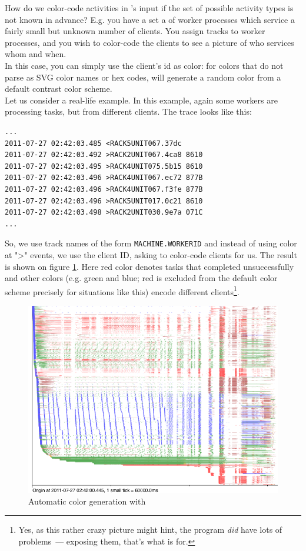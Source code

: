 \documentclass{article}
\begin{document}
How do we color-code activities in \splot{}'s input if the set of possible activity types is not known in advance? E.g. you have a set a of worker processes which service a fairly small but unknown number of clients. You assign tracks to worker processes, and you wish to color-code the clients to see a picture of who services whom and when.
\\
In this case, you can simply use the client's id as color: for colors that do not parse as SVG color names or hex codes, \splot{} will generate a random color from a default contrast color scheme.
\\
Let us consider a real-life example. In this example, again some workers are processing tasks, but from different clients.
The trace looks like this:
\begin{verbatim}
...
2011-07-27 02:42:03.485 <RACK5UNIT067.37dc
2011-07-27 02:42:03.492 >RACK2UNIT067.4ca8 8610
2011-07-27 02:42:03.495 >RACK4UNIT075.5b15 8610
2011-07-27 02:42:03.496 >RACK4UNIT067.ec72 877B
2011-07-27 02:42:03.496 >RACK4UNIT067.f3fe 877B
2011-07-27 02:42:03.496 >RACK5UNIT017.0c21 8610
2011-07-27 02:42:03.498 >RACK2UNIT030.9e7a 071C
...
\end{verbatim}
So, we use track names of the form \verb|MACHINE.WORKERID| and instead of using color at ">" events, we use the client ID, asking \splot{} to color-code clients for us. The result is shown on figure \ref{fig:splot-color-gen}. Here red color denotes tasks that completed unsuccessfully and other colors (e.g. green and blue; red is excluded from the default color scheme precisely for situations like this) encode different clients\footnote{Yes, as this rather crazy picture might hint, the program \emph{did} have lots of problems~--- exposing them, that's what \splot{} is for.}.

\begin{figure}[h]
\center
\includegraphics[width=\textwidth]{pics/splot/splot-color-gen.png}
\caption{Automatic color generation with \splot{}}
\label{fig:splot-color-gen}
\end{figure}
\end{document}
